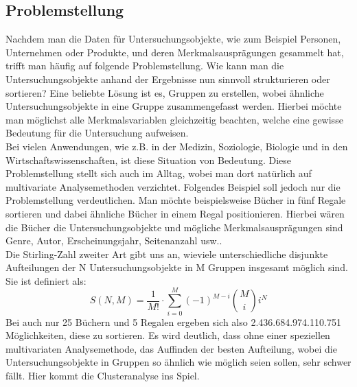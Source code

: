 \documentclass[12pt,titlepage]{article}
\begin{document}
		\subsection{Problemstellung}
			Nachdem man die Daten für Untersuchungsobjekte, wie zum Beispiel Personen, Unternehmen oder Produkte, und deren Merkmalsausprägungen gesammelt hat, trifft man häufig auf folgende Problemstellung. Wie kann man die Untersuchungsobjekte anhand der Ergebnisse nun sinnvoll strukturieren oder sortieren? Eine beliebte Lösung ist es, Gruppen zu erstellen, wobei ähnliche Untersuchungsobjekte in eine Gruppe zusammengefasst werden. Hierbei möchte man möglichst alle Merkmalsvariablen gleichzeitig beachten, welche eine gewisse Bedeutung für die Untersuchung aufweisen.  \\
Bei vielen Anwendungen, wie z.B. in der Medizin, Soziologie, Biologie und in den Wirtschaftswissenschaften, ist diese Situation von Bedeutung. Diese Problemstellung stellt sich auch im Alltag, wobei man dort natürlich auf multivariate Analysemethoden verzichtet. Folgendes Beispiel soll jedoch nur die Problemstellung verdeutlichen. Man möchte beispielsweise Bücher in fünf Regale sortieren und dabei ähnliche Bücher in einem Regal positionieren. Hierbei wären die Bücher die Untersuchungsobjekte und mögliche Merkmalsausprägungen sind Genre, Autor, Erscheinungsjahr, Seitenanzahl usw.. \\
Die Stirling-Zahl zweiter Art \cite[S. 3]{Anderberg2014} gibt uns an, wieviele unterschiedliche disjunkte Aufteilungen der N Untersuchungsobjekte in M Gruppen insgesamt möglich sind. Sie ist definiert als: \\
\begin{equation}
	S(N,M)= \frac{1}{M!} \cdot \sum_{i=0}^{M} (-1)^{M-i} {{M} \choose {i}} i^{N}
\end{equation}
Bei auch nur 25 Büchern und 5 Regalen ergeben sich also 2.436.684.974.110.751 Möglichkeiten, diese zu sortieren. Es wird deutlich, dass ohne einer speziellen multivariaten Analysemethode, das Auffinden der besten Aufteilung, wobei die Untersuchungsobjekte in Gruppen so ähnlich wie möglich seien sollen, sehr schwer fällt. Hier kommt die Clusteranalyse ins Spiel.
\end{document}
